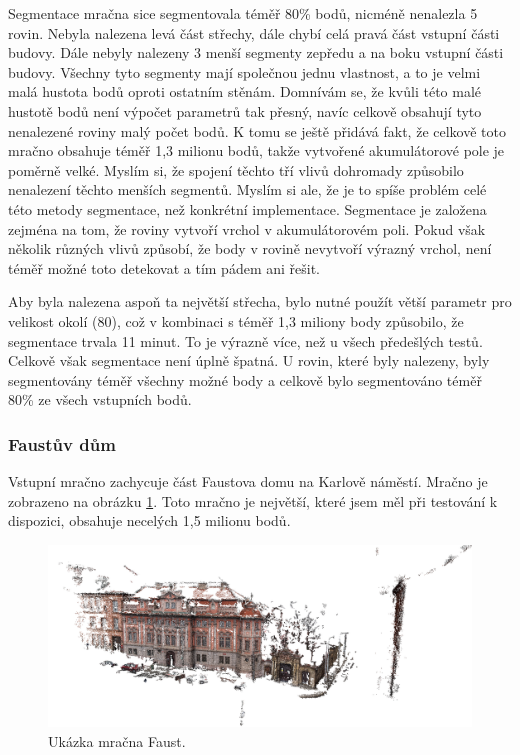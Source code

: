 \documentclass[11pt,twoside,a4paper]{book}
\begin{document}
Segmentace mračna sice segmentovala téměř 80\% bodů, nicméně nenalezla 5 rovin. Nebyla nalezena levá část střechy, dále chybí celá pravá část vstupní části budovy. Dále nebyly nalezeny 3 menší segmenty zepředu a na boku vstupní části budovy. Všechny tyto segmenty mají společnou jednu vlastnost, a to je velmi malá hustota bodů oproti ostatním stěnám. Domnívám se, že kvůli této malé hustotě bodů není výpočet parametrů tak přesný, navíc celkově obsahují tyto nenalezené roviny malý počet bodů. K tomu se ještě přidává fakt, že celkově toto mračno obsahuje téměř 1,3 milionu bodů, takže vytvořené akumulátorové pole je poměrně velké. Myslím si, že spojení těchto tří vlivů dohromady způsobilo nenalezení těchto menších segmentů. Myslím si ale, že je to spíše problém celé této metody segmentace, než konkrétní implementace. Segmentace je založena zejména na tom, že roviny vytvoří vrchol v akumulátorovém poli. Pokud však několik různých vlivů způsobí, že body v rovině nevytvoří výrazný vrchol, není téměř možné toto detekovat a tím pádem ani řešit.

Aby byla nalezena aspoň ta největší střecha, bylo nutné použít větší parametr pro velikost okolí (80), což v kombinaci s téměř 1,3 miliony body způsobilo, že segmentace trvala 11 minut. To je výrazně více, než u všech předešlých testů. Celkově však segmentace není úplně špatná. U rovin, které byly nalezeny, byly segmentovány téměř všechny možné body a celkově bylo segmentováno téměř 80\% ze všech vstupních bodů. 


\cleardoublepage
\subsubsection{Faustův dům}

Vstupní mračno zachycuje část Faustova domu na Karlově náměstí. Mračno je zobrazeno na obrázku \ref{fig:faust}. Toto mračno je největší, které jsem měl při testování k dispozici, obsahuje necelých 1,5 milionu bodů.

\begin{figure}[H]
\begin{center}
\includegraphics[width=\textwidth]{figures/faust}
\caption{Ukázka mračna Faust.}
\label{fig:faust}
\end{center}
\end{figure}
\end{document}
